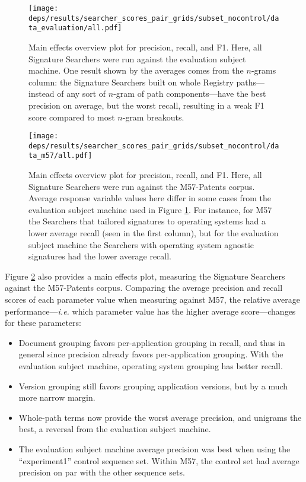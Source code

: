 \documentclass[11pt]{ucthesis}
\theoremstyle{plain}
\theoremstyle{definition}
\newcommand{\ie}{\emph{i.e.}\xspace}
\begin{document}
\begin{landscape}
  \begin{figure}
    \centering
    \texttt{[image: deps/results/searcher\_scores\_pair\_grids/subset\_nocontrol/data\_evaluation/all.pdf]}
    \caption{\label{fig:maineffects:evaluation:all} Main effects overview plot for precision, recall, and F1.  Here, all Signature Searchers were run against the evaluation subject machine.  One result shown by the averages comes from the $n$-grams column: the Signature Searchers built on whole Registry paths---instead of any sort of $n$-gram of path components---have the best precision on average, but the worst recall, resulting in a weak F1 score compared to most $n$-gram breakouts.}
  \end{figure}
\end{landscape}

\begin{landscape}
  \begin{figure}
    \centering
    \texttt{[image: deps/results/searcher\_scores\_pair\_grids/subset\_nocontrol/data\_m57/all.pdf]}
    \caption{\label{fig:maineffects:m57:all} Main effects overview plot for precision, recall, and F1.  Here, all Signature Searchers were run against the M57-Patents corpus.  Average response variable values here differ in some cases from the evaluation subject machine used in Figure \ref{fig:maineffects:evaluation:all}.  For instance, for M57 the Searchers that tailored signatures to operating systems had a lower average recall (seen in the first column), but for the evaluation subject machine the Searchers with operating system agnostic signatures had the lower average recall.}
  \end{figure}
\end{landscape}

Figure \ref{fig:maineffects:m57:all} also provides a main effects plot, measuring the Signature Searchers against the M57-Patents corpus.  Comparing the average precision and recall scores of each parameter value when measuring against M57, the relative average performance---\ie which parameter value has the higher average score---changes for these parameters:

\begin{itemize}
\item Document grouping favors per-application grouping in recall, and thus in general since precision already favors per-application grouping.  With the evaluation subject machine, operating system grouping has better recall.
\item Version grouping still favors grouping application versions, but by a much more narrow margin.
\item Whole-path terms now provide the worst average precision, and unigrams the best, a reversal from the evaluation subject machine.
\item The evaluation subject machine average precision was best when using the ``experiment1'' control sequence set.  Within M57, the control set had average precision on par with the other sequence sets.
\end{itemize}
\end{document}

